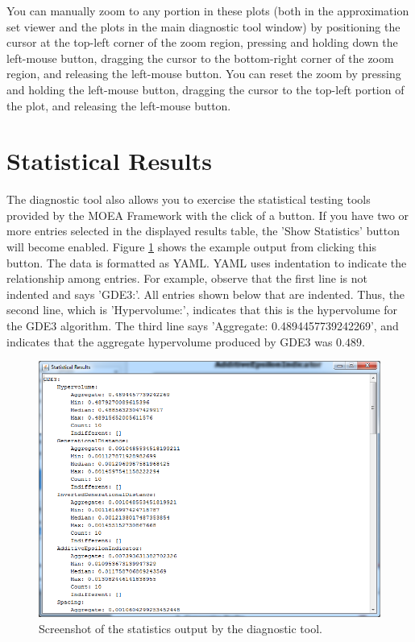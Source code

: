 \begin{tip}
  You can manually zoom to any portion in these plots (both in the approximation set viewer and the plots in the main diagnostic tool window) by positioning the cursor at the top-left corner of the zoom region, pressing and holding down the left-mouse button, dragging the cursor to the bottom-right corner of the zoom region, and releasing the left-mouse button.  You can reset the zoom by pressing and holding the left-mouse button, dragging the cursor to the top-left portion of the plot, and releasing the left-mouse button.
\end{tip}

\section{Statistical Results}
The diagnostic tool also allows you to exercise the statistical testing tools provided by the MOEA Framework with the click of a button.  If you have two or more entries selected in the displayed results table, the 'Show Statistics' button will become enabled.  Figure \ref{fig:statisticalResultsViewer} shows the example output from clicking this button.  The data is formatted as YAML.  YAML uses indentation to indicate the relationship among entries.  For example, observe that the first line is not indented and says 'GDE3:'.  All entries shown below that are indented.  Thus, the second line, which is 'Hypervolume:', indicates that this is the hypervolume for the GDE3 algorithm.  The third line says 'Aggregate: 0.4894457739242269', and indicates that the aggregate hypervolume produced by GDE3 was $0.489$.

\begin{figure}
  \includegraphics[width=\linewidth]{statisticalResultsViewer.png}
  \caption{Screenshot of the statistics output by the diagnostic tool.}
  \label{fig:statisticalResultsViewer}
\end{figure}

